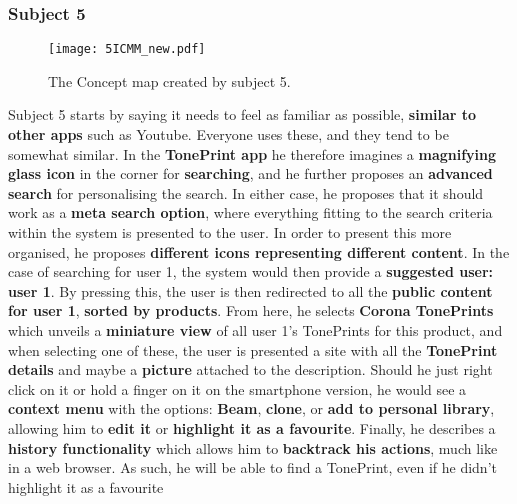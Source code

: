 \subsubsection{Subject 5}
\label{Subject5}
%
\begin{figure}[H]
	\centering
	\texttt{[image: 5ICMM\_new.pdf]}
	\caption{The Concept map created by subject 5.}
	\label{fig:ICMM5}
\end{figure}
%
Subject 5 starts by saying it needs to feel as familiar as possible, \textbf{similar to other apps} such as Youtube. Everyone uses these, and they tend to be somewhat similar. In the \textbf{TonePrint app} he therefore imagines a \textbf{magnifying glass icon} in the corner for \textbf{searching}, and he further proposes an \textbf{advanced search} for personalising the search. In either case, he proposes that it should work as a \textbf{meta search option}, where everything fitting to the search criteria within the system is presented to the user. In order to present this more organised, he proposes \textbf{different icons representing different content}. In the case of searching for user 1, the system would then provide a \textbf{suggested user: user 1}. By pressing this, the user is then redirected to all the \textbf{public content for user 1}, \textbf{sorted by products}. From here, he selects \textbf{Corona TonePrints} which unveils a \textbf{miniature view} of all user 1's TonePrints for this product, and when selecting one of these, the user is presented a site with all the \textbf{TonePrint details} and maybe a \textbf{picture} attached to the description. Should he just right click on it or hold a finger on it on the smartphone version, he would see a \textbf{context menu} with the options: \textbf{Beam}, \textbf{clone}, or \textbf{add to personal library}, allowing him to \textbf{edit it} or \textbf{highlight it as a favourite}. Finally, he describes a \textbf{history functionality} which allows him to \textbf{backtrack his actions}, much like in a web browser. As such, he will be able to find a TonePrint, even if he didn't highlight it as a favourite
%

